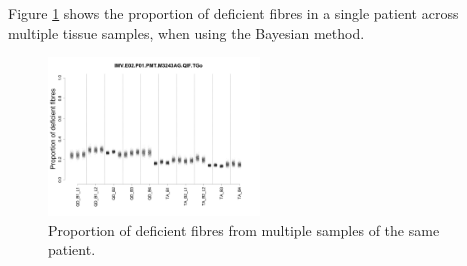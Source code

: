 \documentclass[a4paper, 12pt]{article}
\begin{document}
Figure \ref{fig:IMV} shows the proportion of deficient fibres in a single patient across multiple tissue samples, when using the Bayesian method. 

\begin{figure}[H]
    \centering
    \includegraphics[width=0.5\textwidth]{bayes_prop.png}
    \caption{Proportion of deficient fibres from multiple samples of the same patient. }
    \label{fig:IMV}
\end{figure}
\end{document}
